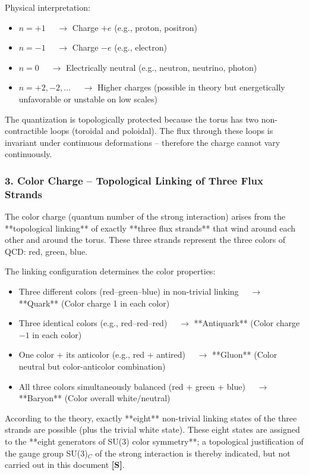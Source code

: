 Physical interpretation:
\begin{itemize}
	\item $n = +1$ $\quad \to$ Charge $+e$ \quad (e.g., proton, positron)
	\item $n = -1$ $\quad \to$ Charge $-e$ \quad (e.g., electron)
	\item $n = 0$   $\quad \to$ Electrically neutral \quad (e.g., neutron, neutrino, photon)
	\item $n = +2, -2, \dots$ $\quad \to$ Higher charges (possible in theory but energetically unfavorable or unstable on low scales)
\end{itemize}

The quantization is topologically protected because the torus has two non-contractible loops (toroidal and poloidal). The flux through these loops is invariant under continuous deformations – therefore the charge cannot vary continuously.

\subsubsection{3. Color Charge – Topological Linking of Three Flux Strands}

The color charge (quantum number of the strong interaction) arises from the **topological linking** of exactly **three flux strands** that wind around each other and around the torus. These three strands represent the three colors of QCD: red, green, blue.

The linking configuration determines the color properties:
\begin{itemize}
	\item Three different colors (red–green–blue) in non-trivial linking $\quad \to$ **Quark** \quad (Color charge 1 in each color)
	\item Three identical colors (e.g., red–red–red) $\quad \to$ **Antiquark** \quad (Color charge $-1$ in each color)
	\item One color + its anticolor (e.g., red + antired) $\quad \to$ **Gluon** \quad (Color neutral but color-anticolor combination)
	\item All three colors simultaneously balanced (red + green + blue) $\quad \to$ **Baryon** \quad (Color overall white/neutral)
\end{itemize}

According to the theory, exactly **eight** non-trivial linking states of the three strands are possible (plus the trivial white state). These eight states are assigned to the **eight generators of SU(3) color symmetry**; a topological justification of the gauge group SU(3)$_C$ of the strong interaction is thereby indicated, but not carried out in this document \textbf{[S]}.

